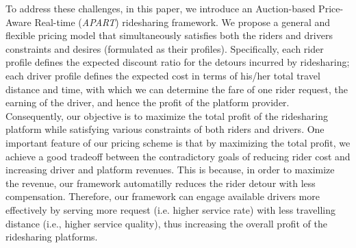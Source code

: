 To address these challenges, in this paper, we introduce an Auction-based Price-Aware Real-time (\textit{APART}) ridesharing framework. We propose a general and flexible pricing model that simultaneously satisfies both the riders and drivers constraints and desires (formulated as their profiles). Specifically, each rider profile defines the expected discount ratio for the detours incurred by ridesharing; each driver profile defines the expected cost in terms of his/her total travel distance and time, with which we can determine the fare of one rider request, the earning of the driver, and hence the profit of the platform provider. Consequently, our objective is to maximize the total profit of the ridesharing platform while satisfying various constraints of both riders and drivers. One important feature of our pricing scheme is that by maximizing the total profit, we achieve a good tradeoff between the contradictory goals of reducing rider cost and increasing driver and platform revenues. This is because, in order to maximize the revenue, our framework automatilly reduces the rider detour with less compensation. Therefore, our framework can engage available drivers more effectively by serving more request (i.e. higher service rate) with less travelling distance (i.e., higher service quality), thus increasing the overall profit of the ridesharing platforms. 




